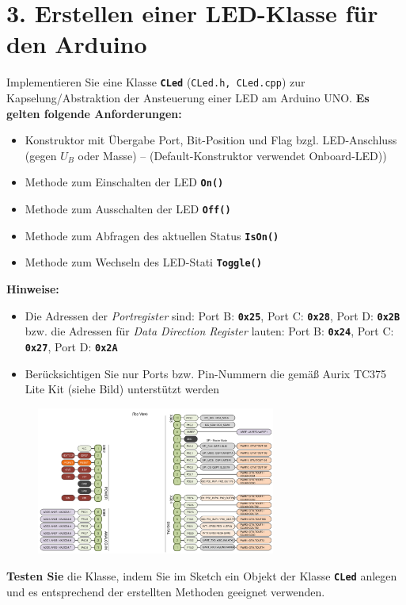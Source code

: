 \documentclass[
    fontsize=12pt,                      %
    paper=a4,                           %
    twoside=off,                       %
    DIV=15,                             %
    BCOR=12mm,                          %
    headings=normal,                    %
    headsepline=false,                   %
    footsepline=false,                  %
    headinclude=true,                   %
    footinclude=false,                  %
    toc=listof,                         %
    toc=bib,                            %
    chapterprefix=false,                %
    appendixprefix=false,               %
    numbers=noendperiod,                %
    captions=tableabove,                %
    footnotes=multiple,                 %
    bibliography=oldstyle,              %
    draft=false,                        %
]{scrreprt}
\newcommand{\Farbcode}[1]{\texttt{\textbf{\textcolor{myred}{#1}}}}
\begin{document}
\section*{3. Erstellen einer LED-Klasse für den Arduino}
Implementieren Sie eine Klasse \Farbcode{CLed} (\texttt{CLed.h, CLed.cpp}) zur Kapselung/Abstraktion der Ansteuerung einer LED am Arduino UNO.
\vskip 0.2cm 
\noindent \textbf{Es gelten folgende Anforderungen:}\begin{itemize}
\item Konstruktor mit Übergabe Port, Bit-Position und Flag bzgl. LED-Anschluss (gegen $U_B$ oder Masse) -- (Default-Konstruktor verwendet Onboard-LED))
\item Methode zum Einschalten der LED \Farbcode{On()}
\item Methode zum Ausschalten der LED \Farbcode{Off()}
\item Methode zum Abfragen des aktuellen Status \Farbcode{IsOn()}
\item Methode zum Wechseln des LED-Stati \Farbcode{Toggle()}
\end{itemize}
\vskip 0.2cm 
\noindent \textbf{Hinweise:}
\begin{itemize}
\item Die Adressen der \emph{Portregister} sind: Port B: \Farbcode{0x25}, Port C: \Farbcode{0x28}, Port D: \Farbcode{0x2B} bzw. die Adressen für \emph{Data Direction Register} lauten: Port B: \Farbcode{0x24}, Port C: \Farbcode{0x27}, Port D: \Farbcode{0x2A}
\item Berücksichtigen Sie nur Ports bzw. Pin-Nummern die gemäß Aurix TC375 Lite Kit (siehe Bild) unterstützt werden
\end{itemize}

\begin{figure}[H]
	\centering
	\includegraphics[width=0.7\textwidth]{Figures/Uebung_104_Arduino_Pins.png}
\end{figure}
\noindent
\textbf{Testen Sie} die Klasse, indem Sie im Sketch ein Objekt der Klasse \Farbcode{CLed} anlegen und es entsprechend der erstellten Methoden geeignet verwenden.
\end{document}
